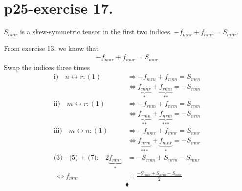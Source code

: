 \section{p25-exercise 17.}
\begin{tcolorbox}
$S_{nmr}$ is a skew-symmetric tensor in the first two indices.
 $-f_{mnr} + f_{nmr} = S_{mnr}$.
\end{tcolorbox}
From exercise 13. we know that 
\begin{align}
-f_{mnr} + f_{nmr} = S_{mnr}
\end{align}
Swap the indices three times
\begin{align}
\text{i)}\quad n \leftrightarrow r: (1) &\Rightarrow -f_{mrn} + f_{rmn } = S_{mrn}\\
\ &\Leftrightarrow \underbrace{f_{mnr}}_\text{*} + \underbrace{f_{rmn }}_\text{**} = -S_{rmn}\\
\text{ii)}\quad m \leftrightarrow r: (1) &\Rightarrow -f_{rnm} + f_{nrm } = S_{rnm}\\
\ &\Leftrightarrow \underbrace{f_{rmn}}_\text{**} + \underbrace{f_{nrm }}_\text{***} = -S_{nrm}\\
\text{iii)}\quad m \leftrightarrow n: (1) &\Rightarrow -f_{nmr} + f_{mnr } = S_{nmr}\\
\ &\Leftrightarrow \underbrace{f_{nrm}}_\text{***} + \underbrace{f_{mnr }}_\text{*} = -S_{mnr}\\
\text{(3) - (5) + (7):} \quad 2\underbrace{f_{mnr}}_\text{*} &= -S_{rmn}+S_{nrm}-S_{mnr}\\
\ \Leftrightarrow f_{mnr} &= \frac{-S_{rmn}+S_{nrm}-S_{mnr}}{2}
\end{align}
$$\blacklozenge$$
\pagebreak[4]